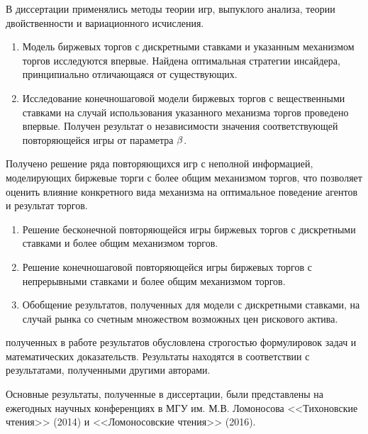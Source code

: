 {\methods} В диссертации применялись методы теории игр, выпуклого анализа, теории двойственности и вариационного исчисления.

{\novelty}
\begin{enumerate}
\item 
Модель биржевых торгов с дискретными ставками и указанным механизмом торгов исследуются впервые.
Найдена оптимальная стратегии инсайдера, принципиально отличающаяся от существующих.
\item 
Исследование конечношаговой модели биржевых торгов с вещественными ставками на случай использования указанного механизма торгов проведено впервые.
Получен результат о независимости значения соответствующей повторяющейся игры от параметра $\beta$.
\end{enumerate}

{\influence} Получено решение ряда повторяющихся игр с неполной информацией, моделирующих биржевые торги с более общим механизмом торгов, что позволяет оценить влияние конкретного вида механизма на оптимальное поведение агентов и результат торгов.

{}
\begin{enumerate}
\item
Решение бесконечной повторяющейся игры биржевых торгов с дискретными ставками и более общим механизмом торгов.
\item
Решение конечношаговой повторяющейся игры биржевых торгов с непрерывными ставками и более общим механизмом торгов.
\item
Обобщение результатов, полученных для модели с дискретными ставками, на случай рынка со счетным множеством возможных цен рискового актива.
\end{enumerate}

{\reliability} полученных в работе результатов обусловлена строгостью формулировок задач и математических доказательств.
Результаты находятся в соответствии с результатами, полученными другими авторами.

{\probation} Основные результаты, полученные в диссертации, были представлены на ежегодных научных конференциях в МГУ им. М.В. Ломоносова <<Тихоновские чтения>> (2014) и <<Ломоносовские чтения>> (2016).

